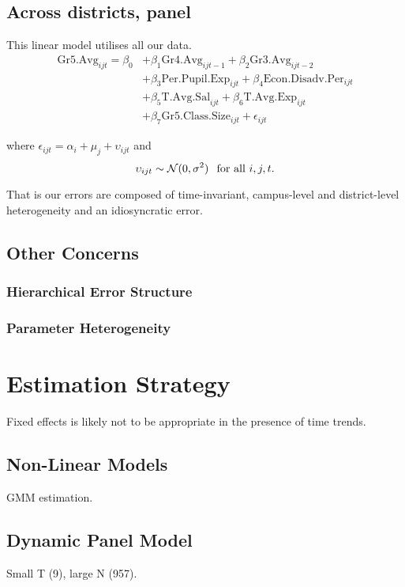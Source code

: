 \documentclass[11pt]{article}
\newcommand{\N}{\mathcal{N}}
\begin{document}
\subsection{Across districts, panel}
\label{ss:nextsub4}

This linear model utilises all our data.
\begin{align*}
\mathrm{Gr5.Avg}_{ijt} = \beta_{0} 
    &+ \beta_{1}  \mathrm{Gr4.Avg}_{ijt-1} 
    + \beta_{2}  \mathrm{Gr3.Avg}_{ijt-2}    \\
    &+ \beta_{3}  \mathrm{Per.Pupil.Exp}_{ijt} 
    + \beta_{4}  \mathrm{Econ.Disadv.Per}_{ijt} \\
    &+ \beta_{5}  \mathrm{T.Avg.Sal}_{ijt}   
    + \beta_{6}  \mathrm{T.Avg.Exp}_{ijt}  \\
    &+ \beta_{7}  \mathrm{Gr5.Class.Size}_{ijt} + \epsilon_{ijt}
\end{align*}

where $\epsilon_{ijt}=\alpha_{i}+\mu_{j}+\upsilon_{ijt}$ and
$$\upsilon_{ijt} \sim \N(0,\sigma^2) \hspace{0.1in} \mbox{for all } i,j,t.$$

That is  our errors are composed of time-invariant, campus-level and district-level heterogeneity and an idiosyncratic error. 

\subsection{Other Concerns}

\subsubsection{Hierarchical Error Structure}

\subsubsection{Parameter Heterogeneity}




\section{Estimation Strategy}

Fixed effects is likely not to be appropriate in the presence of time trends. 

\subsection{Non-Linear Models}

GMM estimation.

\subsection{Dynamic Panel Model}

Small T (9), large N (957). 
\end{document}
